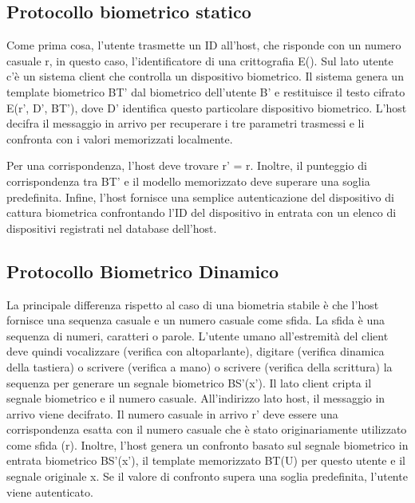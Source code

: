 \subsection{Protocollo biometrico statico}
Come prima cosa, l'utente trasmette un ID all'host, che risponde con un numero casuale r, in questo caso, l'identificatore di una crittografia E(). Sul lato utente c'è un sistema client che controlla un dispositivo biometrico. Il sistema genera un template biometrico BT' dal biometrico dell'utente B' e restituisce il testo cifrato E(r', D', BT'), dove D' identifica questo particolare dispositivo biometrico. L'host decifra il messaggio in arrivo per recuperare i tre parametri trasmessi e li confronta con i valori memorizzati localmente.

\singlespacing

Per una corrispondenza, l'host deve trovare r' = r. Inoltre, il punteggio di corrispondenza tra BT' e il modello memorizzato deve superare una soglia predefinita. Infine, l'host fornisce una semplice autenticazione del dispositivo di cattura biometrica confrontando l'ID del dispositivo in entrata con un elenco di dispositivi registrati nel database dell'host.

\subsection{Protocollo Biometrico Dinamico}

La principale differenza rispetto al caso di una biometria stabile è che l'host fornisce una sequenza casuale e un numero casuale come sfida. La sfida è una sequenza di numeri, caratteri o parole. L'utente umano all'estremità del client deve quindi vocalizzare (verifica con altoparlante), digitare (verifica dinamica della tastiera) o scrivere (verifica a mano) o scrivere (verifica della scrittura) la sequenza per generare un segnale biometrico BS'(x'). Il lato client cripta il segnale biometrico e il numero casuale. All'indirizzo lato host, il messaggio in arrivo viene decifrato. Il numero casuale in arrivo r' deve essere una corrispondenza esatta con il numero casuale che è stato originariamente utilizzato come sfida (r). Inoltre, l'host genera un confronto basato sul segnale biometrico in entrata biometrico BS'(x'), il template memorizzato BT(U) per questo utente e il segnale originale x. Se il valore di confronto supera una soglia predefinita, l'utente viene autenticato.
